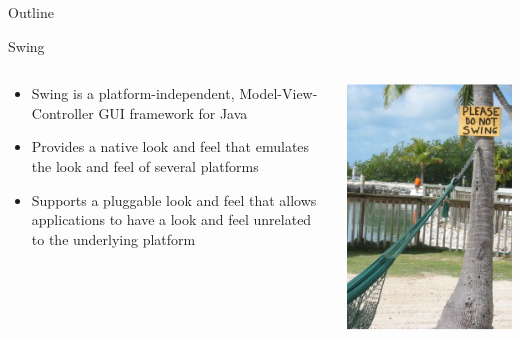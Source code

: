 \begin{frame}{Outline}
  \tableofcontents[current]
\end{frame}

\begin{frame}{Swing}
  \begin{columns}[c]
    \begin{column}{0.55\textwidth}
      \begin{itemize}
      \item Swing is a platform-independent, Model-View-Controller GUI
        framework for Java
      \item Provides a native look and feel that emulates the look and
        feel of several platforms
      \item Supports a pluggable look and feel that allows applications to
        have a look and feel unrelated to the underlying platform
      \end{itemize}
    \end{column}
    \begin{column}{0.45\textwidth}
      \begin{center}
        \includegraphics[width=\textwidth]{figures/do-not-swing}
      \end{center}
    \end{column}
  \end{columns}
\end{frame}

